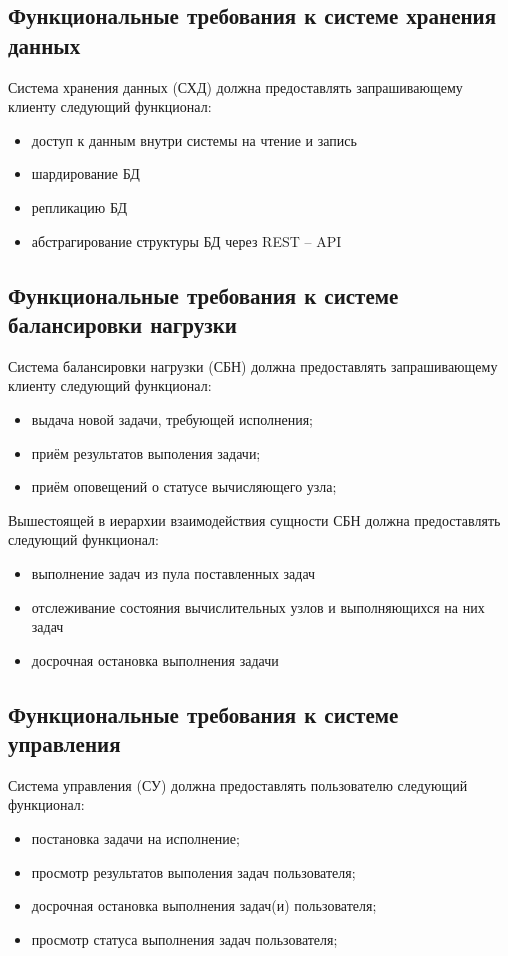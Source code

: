 \documentclass[a4paper,12pt]{report}
\numberwithin{equation}{section}
\begin{document}
\subsection{Функциональные требования к системе хранения данных}
Система хранения данных (СХД) должна предоставлять запрашивающему клиенту следующий функционал:
\begin{itemize}
  \item доступ к данным внутри системы на чтение и запись
  \item шардирование БД
  \item репликацию БД
  \item абстрагирование структуры БД через REST -- API
\end{itemize}

\subsection{Функциональные требования к системе балансировки нагрузки}
Система балансировки нагрузки (СБН) должна предоставлять запрашивающему клиенту следующий функционал:
\begin{itemize}
  \item выдача новой задачи, требующей исполнения;
  \item приём результатов выполения задачи;
  \item приём оповещений о статусе вычисляющего узла;
\end{itemize}

Вышестоящей в иерархии взаимодействия сущности СБН должна предоставлять следующий функционал:
\begin{itemize}
  \item выполнение задач из пула поставленных задач
  \item отслеживание состояния вычислительных узлов и выполняющихся на них задач
  \item досрочная остановка выполнения задачи
\end{itemize}

\subsection{Функциональные требования к системе управления}
Система управления (СУ) должна предоставлять пользователю следующий функционал:
\begin{itemize}
  \item постановка задачи на исполнение;
  \item просмотр результатов выполения задач пользователя;
  \item досрочная остановка выполнения задач(и) пользователя;
  \item просмотр статуса выполнения задач пользователя;
\end{itemize}
\end{document}
